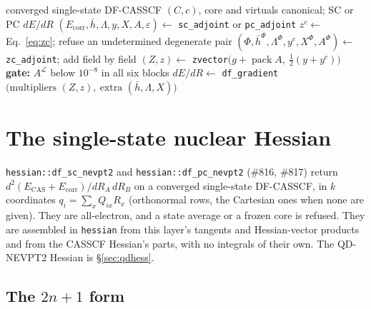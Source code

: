 \documentclass[11pt]{article}
\newcommand{\code}[1]{\texttt{#1}}
\newcommand{\eps}{\varepsilon}
\newcommand{\Ecas}{E_{\mathrm{CAS}}}
\newcommand{\Ecorr}{E_{\mathrm{corr}}}
\newcommand{\hb}{\bar h}
\newcommand{\Lb}{\Lambda}
\begin{document}
\begin{algorithm}[htbp]
\caption{The DF-NEVPT2 nuclear gradient (\code{sc\_gradient}, \code{pc\_gradient})}
\label{alg:ssgrad}
\begin{algorithmic}[1]
\Require converged single-state DF-CASSCF $(C, c)$, core and virtuals canonical; SC or PC
\Ensure $dE/dR$
\State $(\Ecorr, \hb, \Lb, y, X, A, \eps) \gets$ \code{sc\_adjoint} or \code{pc\_adjoint}
\State $z^c \gets$ Eq.~\eqref{eq:zc}; refuse an undetermined degenerate pair
\State $(\Phi, \hb^\Phi, \Lb^\Phi, y^c, X^\Phi, A^\Phi) \gets$ \code{zc\_adjoint}; add field by field
\State $(Z, z) \gets$ \code{zvector}$\bigl(g + \operatorname{pack}A,\ \tfrac12(y + y^c)\bigr)$
\State \textbf{gate:} $A^{\mathcal L}$ below $10^{-8}$ in all six blocks
\State $dE/dR \gets$ \code{df\_gradient}$\bigl(\text{multipliers } (Z,z),\ \text{extra } (\hb, \Lb, X)\bigr)$
\end{algorithmic}
\end{algorithm}

\section{The single-state nuclear Hessian}
\label{sec:hessian}

\code{hessian::df\_sc\_nevpt2} and \code{hessian::df\_pc\_nevpt2} (\#816,
\#817) return $d^2(\Ecas + \Ecorr)/dR_A\,dR_B$ on a converged single-state
DF-CASSCF, in $k$ coordinates $q_i = \sum_x Q_{ix}R_x$ (orthonormal rows, the
Cartesian ones when none are given). They are all-electron, and a state
average or a frozen core is refused. They are assembled in \code{hessian}
from this layer's tangents and Hessian-vector products and from the CASSCF
Hessian's parts, with no integrals of their own. The QD-NEVPT2 Hessian is
\S\ref{sec:qdhess}.

\subsection{The $2n+1$ form}
\end{document}
